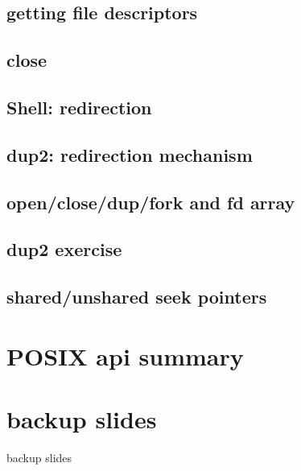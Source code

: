 \subsection{getting file descriptors}




\subsection{close}



\subsection{Shell: redirection}




\subsection{dup2: redirection mechanism}



\subsection{open/close/dup/fork and fd array}


\subsection{dup2 exercise}


\subsection{shared/unshared seek pointers}


\section{POSIX api summary}





\section{backup slides}
\begin{frame}{backup slides}
\end{frame}




